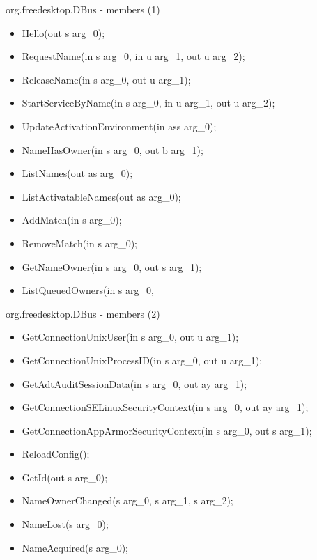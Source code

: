 \documentclass{beamer}
\begin{document}
\begin{frame}{org.freedesktop.DBus - members (1)}
  \begin{itemize}
\item Hello(out s arg\_0);
\item RequestName(in  s arg\_0,
            in  u arg\_1,
            out u arg\_2);
\item ReleaseName(in  s arg\_0,
            out u arg\_1);
\item StartServiceByName(in  s arg\_0,
                   in  u arg\_1,
                   out u arg\_2);
\item UpdateActivationEnvironment(in  a{ss} arg\_0);
\item NameHasOwner(in  s arg\_0,
             out b arg\_1);
\item ListNames(out as arg\_0);
\item ListActivatableNames(out as arg\_0);
\item AddMatch(in  s arg\_0);
\item RemoveMatch(in  s arg\_0);
\item GetNameOwner(in  s arg\_0,
             out s arg\_1);
\item ListQueuedOwners(in  s arg\_0,
  \end{itemize}
\end{frame}

\begin{frame}{org.freedesktop.DBus - members (2)}
  \begin{itemize}
\item GetConnectionUnixUser(in  s arg\_0,
                      out u arg\_1);
\item GetConnectionUnixProcessID(in  s arg\_0,
                           out u arg\_1);
\item GetAdtAuditSessionData(in  s arg\_0,
                       out ay arg\_1);
\item GetConnectionSELinuxSecurityContext(in  s arg\_0,
                                    out ay arg\_1);
\item GetConnectionAppArmorSecurityContext(in  s arg\_0,
                                     out s arg\_1);
\item ReloadConfig();
\item GetId(out s arg\_0);



\item NameOwnerChanged(s arg\_0,
                 s arg\_1,
                 s arg\_2);
\item NameLost(s arg\_0);
\item NameAcquired(s arg\_0);
  \end{itemize}
\end{frame}
\end{document}
